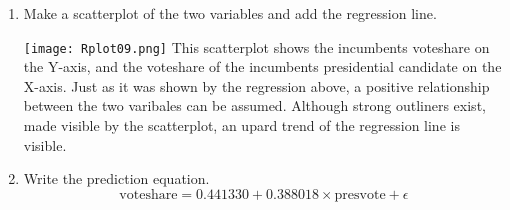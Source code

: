 \documentclass[12pt,letterpaper]{article}
\begin{document}
\begin{enumerate}
			\vspace{8cm}
		\item Make a scatterplot of the two variables and add the regression line. 
 
    \texttt{[image: Rplot09.png]}
This scatterplot shows the incumbents voteshare on the Y-axis, and the voteshare of the incumbents presidential candidate on the X-axis. Just as it was shown by the regression above, a positive relationship between the two varibales can be assumed.  Although strong outliners exist, made visible by the scatterplot, an upard trend of the regression line is visible. 
		\item Write the prediction equation.
\begin{equation}
\text{voteshare} = 0.441330 + 0.388018 \times \text{presvote} + \epsilon
\end{equation}
	\end{enumerate}
	

\newpage	
\end{document}

